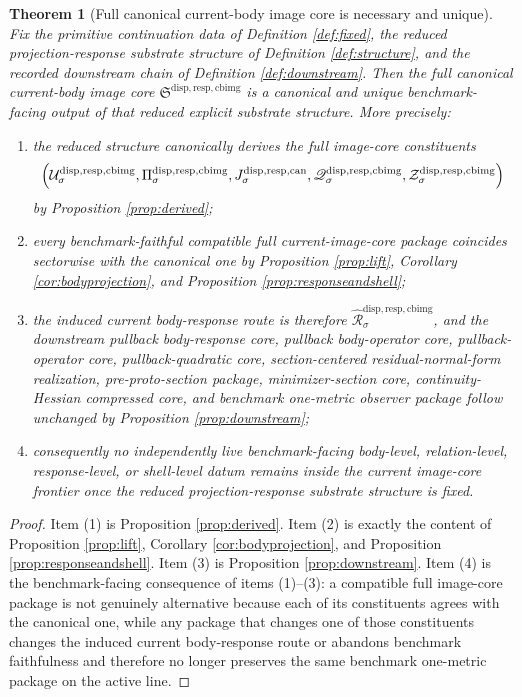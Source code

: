 \documentclass[11pt]{article}
\newcommand{\CurrentBodyImageCore}{\mathfrak S^{\mathrm{disp,resp,cbimg}}}
\newcommand{\CanonicalLift}[1]{J_{#1}^{\mathrm{disp,resp,can}}}
\newcommand{\CoreForcedBodyResponse}[1]{\widehat{\mathscr R}_{#1}^{\mathrm{disp,resp,cbimg}}}
\newcommand{\CanonicalImageBody}[1]{\mathcal U_{#1}^{\mathrm{disp,resp,cbimg}}}
\newcommand{\ImageProjection}[1]{\Pi_{#1}^{\mathrm{disp,resp,cbimg}}}
\newcommand{\CanonicalImageResponseLaw}[1]{\mathscr Q_{#1}^{\mathrm{disp,resp,cbimg}}}
\newcommand{\CanonicalImageShell}[1]{\mathcal Z_{#1}^{\mathrm{disp,resp,cbimg}}}
\newtheorem{theorem}{Theorem}
\begin{document}
\begin{theorem}[Full canonical current-body image core is necessary and unique]
\label{thm:main}
Fix the primitive continuation data of Definition \ref{def:fixed}, the reduced projection-response substrate structure of Definition \ref{def:structure}, and the recorded downstream chain of Definition \ref{def:downstream}. Then the full canonical current-body image core \(\CurrentBodyImageCore\) is a canonical and unique benchmark-facing output of that reduced explicit substrate structure. More precisely:
\begin{enumerate}
    \item the reduced structure canonically derives the full image-core constituents
    \[
    \Bigl(
    \CanonicalImageBody{\sigma},
    \ImageProjection{\sigma},
    \CanonicalLift{\sigma},
    \CanonicalImageResponseLaw{\sigma},
    \CanonicalImageShell{\sigma}
    \Bigr)
    \]
    by Proposition \ref{prop:derived};
    \item every benchmark-faithful compatible full current-image-core package coincides sectorwise with the canonical one by Proposition \ref{prop:lift}, Corollary \ref{cor:bodyprojection}, and Proposition \ref{prop:responseandshell};
    \item the induced current body-response route is therefore \(\CoreForcedBodyResponse{\sigma}\), and the downstream pullback body-response core, pullback body-operator core, pullback-operator core, pullback-quadratic core, section-centered residual-normal-form realization, pre-proto-section package, minimizer-section core, continuity-Hessian compressed core, and benchmark one-metric observer package follow unchanged by Proposition \ref{prop:downstream};
    \item consequently no independently live benchmark-facing body-level, relation-level, response-level, or shell-level datum remains inside the current image-core frontier once the reduced projection-response substrate structure is fixed.
\end{enumerate}
\end{theorem}

\begin{proof}
Item (1) is Proposition \ref{prop:derived}. Item (2) is exactly the content of Proposition \ref{prop:lift}, Corollary \ref{cor:bodyprojection}, and Proposition \ref{prop:responseandshell}. Item (3) is Proposition \ref{prop:downstream}. Item (4) is the benchmark-facing consequence of items (1)--(3): a compatible full image-core package is not genuinely alternative because each of its constituents agrees with the canonical one, while any package that changes one of those constituents changes the induced current body-response route or abandons benchmark faithfulness and therefore no longer preserves the same benchmark one-metric package on the active line.
\end{proof}
\end{document}
